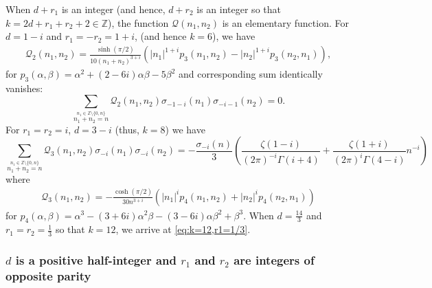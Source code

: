 \documentclass[]{article}
\begin{document}
When $d + r_1$ is an integer (and hence, $d + r_2$ is an integer so that  $k = 2 d + r_1 + r_2 + 2 \in \mathbb{Z}$), the function $\mathcal{Q}(n_1,n_2)$ is an elementary function. 
For $d=1-i$ and $r_1=-r_2 = 1 + i$,  (and hence $k=6$), we have 
\begin{equation}
    \begin{split}
      \mathcal{Q}_2(n_1, n_2 )=  \frac{\sinh (\pi / 2)}{10 (n_1+n_2)^{3+i}}   \left(| n_1| ^{1+i} p_3(n_1,n_2)-| n_2| ^{1+i} p_3(n_2,n_1)\right),
    \end{split}
\end{equation}
for 
$
    p_3(\alpha, \beta ) = \alpha^2 + (2-6 i) \alpha \beta - 5 \beta^2
$
and corresponding sum identically vanishes:
\begin{equation}
\sum_{ \stackrel{n_1 \in \mathbb{Z} \setminus \{ 0,n \}}{n_1+n_2=n}  } \mathcal{Q}_2(n_1, n_2) \sigma_{-1-i}(n_1) \sigma_{-i-1} (n_2) = 0.
\end{equation}
For $r_1 = r_2 = i$, $d=3-i$ (thus, $k=8$) we have 
\begin{equation}
\sum_{ \stackrel{n_1 \in \mathbb{Z} \setminus \{ 0,n \}}{n_1+n_2=n}  } \mathcal{Q}_3(n_1, n_2) \sigma_{-i}(n_1) \sigma_{-i} (n_2) = -\frac{\sigma _{-i}(n)}{3}  \left(    \frac{\zeta(1-i)}{ (2 \pi)^{-i} \Gamma(i+4)  }   + \frac{\zeta(1+i)}{  (2 \pi)^i \Gamma(4-i)  } n^{-i}  \right)
\end{equation}
where 
\begin{equation}
    \begin{split}
        \mathcal{Q}_3(n_1, n_2) = -\frac{ \cosh (\pi  / 2)}{30 n^{3+i}}  \left(| n_1| ^i  p_4(n_1, n_2) +| n_2| ^i p_4(n_2, n_1 ) \right)
    \end{split}
\end{equation}
for 
$
p_4(\alpha, \beta) =     \alpha^3-(3+6 i) \alpha^2 \beta-(3-6 i) \alpha \beta^2+\beta^3.$
When $d=\frac{14}{3}$ and $r_1=r_2=\frac{1}{3}$ so that $k=12$, we arrive at \eqref{eq:k=12,r1=1/3}.


\subsubsection{$d$ is a positive half-integer and $r_1$ and $r_2$ are integers of opposite parity}
\end{document}
